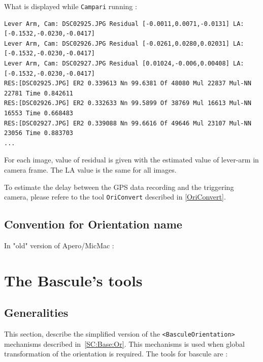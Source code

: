 \vspace{\baselineskip}
What is displayed while {\tt Campari} running :
\begin{verbatim}
Lever Arm, Cam: DSC02925.JPG Residual [-0.0011,0.0071,-0.0131] LA: [-0.1532,-0.0230,-0.0417]
Lever Arm, Cam: DSC02926.JPG Residual [-0.0261,0.0280,0.02031] LA: [-0.1532,-0.0230,-0.0417]
Lever Arm, Cam: DSC02927.JPG Residual [0.01024,-0.006,0.00408] LA: [-0.1532,-0.0230,-0.0417]
RES:[DSC02925.JPG] ER2 0.339613 Nn 99.6381 Of 48080 Mul 22837 Mul-NN 22781 Time 0.842611
RES:[DSC02926.JPG] ER2 0.332633 Nn 99.5899 Of 38769 Mul 16613 Mul-NN 16553 Time 0.668483
RES:[DSC02927.JPG] ER2 0.339088 Nn 99.6616 Of 49646 Mul 23107 Mul-NN 23056 Time 0.883703
...
\end{verbatim}

For each image, value of residual is given with the estimated value of lever-arm in camera frame. The LA value is the same
for all images.

\vspace{\baselineskip}
To estimate the delay between the GPS data recording and the triggering camera,
please refere to the tool {\tt OriConvert} described in \ref{OriConvert}.


\subsection{Convention for Orientation name}

In "old" version of Apero/MicMac :


\section{The Bascule's tools}

\subsection{Generalities}

\label{BASCULE}
This section, describe the simplified version of the {\tt <BasculeOrientation>} mechanisms
described in~\ref{SC:Base:Or}. This mechanisms is used when global transformation of the
orientation is required. The tools for bascule are :

